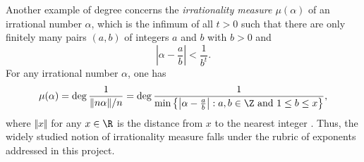 \begin{remark}
Another example of degree concerns the \emph{irrationality measure $\mu(\alpha)$} of an irrational number $\alpha$, which is the infimum of all $t >0$ such that  there are only finitely many pairs $(a,b)$ of integers $a$ and $b$  with $b> 0$ and
$$\left|\alpha -\frac{a}{b} \right| < \frac{1}{b^t}.$$    For any irrational number $\alpha$,  one has
$$\mu(\alpha) = \deg \frac{1}{\Vert n\alpha \Vert/n} = \deg \frac{1}{ \min\left\{ \left| \alpha-\frac{a}{b}\right|: \text{$a,b \in\Z$ and $1 \leq b \leq x$} \right\}},$$
where $\Vert x \Vert$ for any $x \in \R$ is the distance from $x$ to the nearest integer \cite[Chapter 13]{ell}.     Thus, the widely studied notion of irrationality measure falls under the rubric of  exponents addressed in this project.
\end{remark}


